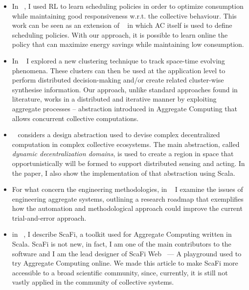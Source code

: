 \documentclass[11pt]{article}
\begin{document}
\begin{itemize}
\item In \textit{}~\cite{rl-middleware}, 
 I used RL to learn scheduling policies 
 in order to optimize consumption 
 while maintaining good responsiveness w.r.t. the collective behaviour.  
This work can be seen as an extension of \textit{}~\cite{zambonelli2021time} 
 in which AC itself is used to define scheduling policies. 
With our approach, it is possible 
 to learn online the policy that can 
 maximize energy savings while maintaining low consumption.

%
\item In \textit{}~\cite{swarm-clustering}
 I explored a new clustering technique to track space-time evolving phenomena. 
% 
These clusters can then be used at the application level to perform 
 distributed decision-making and/or create related cluster-wise synthesise information.
Our approach, unlike standard approaches found in literature, 
 works in a distributed and iterative manner by exploiting 
 aggregate processes -- abstraction introduced in Aggregate Computing 
 that allows concurrent collective computations.

\item \textit{}~\cite{domains} considers a design abstraction used to
 devise complex decentralized computation in complex collective ecosystems.
%
The main abstraction, called \textit{dynamic decentralization domains}, is used to
 create a region in space that opportunistically will be formed to support distributed 
 sensing and acting.
%
In the paper, I also show the implementation of that abstraction using Scala.

\item For what concern the engineering methodologies, in \textit{}~\cite{engineering}
 I examine the issues of engineering aggregate systems, outlining a research roadmap that exemplifies
 how the automation and methodological approach could improve the current
 trial-and-error approach.
%
\item in \textit{}~\cite{scafi-paper}, I describe ScaFi, 
 a toolkit used for Aggregate Computing written in Scala.
ScaFi is not new, in fact, I am one of the main contributors to the software and I am the lead designer of
 ScaFi Web~\cite{aguzzi2021scafi} --- A playground used to try Aggregate Computing online.
We made this article to make ScaFi more accessible to a broad scientific community, 
 since, currently, it is still not vastly applied in the community of collective systems.
\end{itemize}
\end{document}
